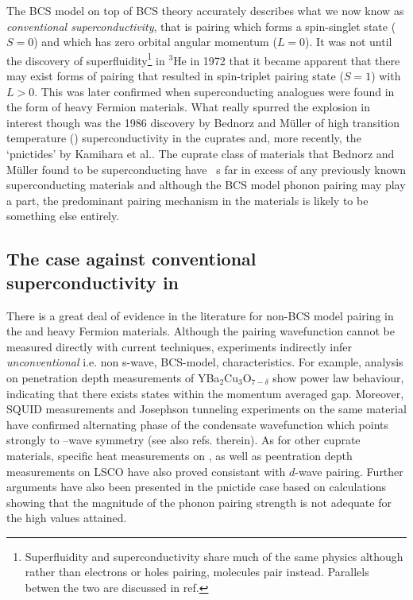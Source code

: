The BCS model on top of BCS theory accurately describes what we now know as \textit{conventional superconductivity}, that is pairing which forms a spin-singlet state ($S=0$) and which has zero orbital angular momentum ($L=0$). It was not until the discovery of superfluidity\footnote{Superfluidity and superconductivity share much of the same physics although rather than electrons or holes pairing, molecules pair instead. Parallels betwen the two are discussed in ref.\cite{Annett2010}} in $^3$He in 1972\cite{Osheroff1972} that it became apparent that there may exist forms of pairing that resulted in spin-triplet pairing state ($S=1$) with $L>0$. This was later confirmed when superconducting analogues were found in the form of heavy Fermion materials. What really spurred the explosion in interest though was the 1986 discovery by Bednorz and M\"uller\cite{Bednorz} of high transition temperature (\Tc) superconductivity in the cuprates and, more recently, the `pnictides' by Kamihara et al.\cite{Kamihara2008}. The cuprate class of materials that Bednorz and M\"uller found to be superconducting have \Tc~s far in excess of any previously known superconducting materials and although the BCS model phonon pairing may play a part, the predominant pairing mechanism in the \highTc materials is likely to be something else entirely.

\subsection{The case against conventional superconductivity in \highTc}

There is a great deal of evidence in the literature for non-BCS model pairing in the \highTc and heavy Fermion materials. Although the pairing wavefunction cannot be measured directly with current techniques, experiments indirectly infer \textit{unconventional} i.e. non s-wave, BCS-model, characteristics. For example, analysis on penetration depth measurements of YBa$_2$Cu$_3$O$_{7-\delta}$ show power law behaviour\cite{Annett1991}, indicating that there exists states within the momentum averaged gap. Moreover, SQUID measurements and Josephson tunneling experiments on the same material have confirmed alternating phase of the condensate wavefunction which points strongly to \DxTwoyTwo--wave symmetry\cite{VanHarlingen1994} (see also refs. therein). As for other cuprate materials, specific heat measurements on \BSCO\cite{Wang2011}, as well as peentration depth measurements on LSCO\cite{Froehlich1996} have also proved consistant with $d$-wave pairing. Further arguments have also been presented in the pnictide case based on calculations showing that the magnitude of the phonon pairing strength is not adequate for the high \Tc values attained\cite{Mazin2008}.

